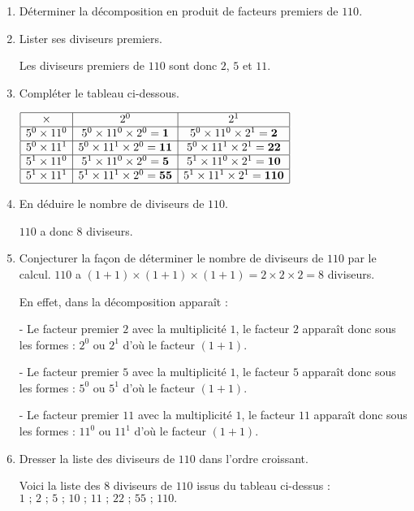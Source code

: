     \begin{enumerate}
        \item Déterminer la décomposition en produit de facteurs premiers de $110$.

        \item Lister ses diviseurs premiers.

        Les diviseurs premiers de $110$ sont donc $2$, $5$ et $11$.
        \item Compléter le tableau ci-dessous.

        \smallskip
        $\renewcommand{\arraystretch}{1}
        \begin{array}{|c|c|c|}
            \hline
            \times & 2^{0} & 2^{1}\\
            \hline
            5^{0}\times11^{0} & 5^{0}\times11^{0}\times2^{0}=\mathbf{1} & 5^{0}\times11^{0}\times2^{1}=\mathbf{2}\\
            \hline
            5^{0}\times11^{1} & 5^{0}\times11^{1}\times2^{0}=\mathbf{11} & 5^{0}\times11^{1}\times2^{1}=\mathbf{22}\\
            \hline
            5^{1}\times11^{0} & 5^{1}\times11^{0}\times2^{0}=\mathbf{5} & 5^{1}\times11^{0}\times2^{1}=\mathbf{10}\\
            \hline
            5^{1}\times11^{1} & 5^{1}\times11^{1}\times2^{0}=\mathbf{55} & 5^{1}\times11^{1}\times2^{1}=\mathbf{110}\\
            \hline
        \end{array}
        \renewcommand{\arraystretch}{1}$
        \smallskip

        \item En déduire le nombre de diviseurs de $110$.

        $110$ a donc $8$ diviseurs.

        \item Conjecturer la façon de déterminer le nombre de diviseurs de $110$ par le calcul.
        $110$ a $(1+1)\times(1+1)\times(1+1) = 2\times2\times2 = 8$ diviseurs.

        En effet, dans la décomposition apparaît :

        - Le facteur premier $2$ avec la multiplicité $1$, le facteur $2$ apparaît donc sous les formes : $2^{0}$ ou $2^{1}$ d'où le facteur $(1+1)$.

        - Le facteur premier $5$ avec la multiplicité $1$, le facteur $5$ apparaît donc sous les formes : $5^{0}$ ou $5^{1}$ d'où le facteur $(1+1)$.

        - Le facteur premier $11$ avec la multiplicité $1$, le facteur $11$ apparaît donc sous les formes : $11^{0}$ ou $11^{1}$ d'où le facteur $(1+1)$.

        \item Dresser la liste des diviseurs de $110$ dans l'ordre croissant.

        Voici la liste des $8$ diviseurs de $110$ issus du tableau ci-dessus : $1\text{ ; }2\text{ ; }5\text{ ; }10\text{ ; }11\text{ ; }22\text{ ; }55\text{ ; }110.$

    \end{enumerate}
